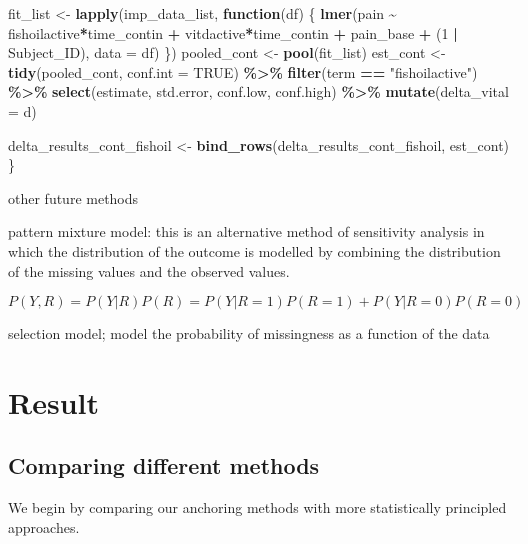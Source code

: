 \documentclass{article}
\newenvironment{Shaded}{\begin{snugshade}}{\end{snugshade}}
\newcommand{\AttributeTok}[1]{\textcolor[rgb]{0.13,0.29,0.53}{#1}}
\newcommand{\ConstantTok}[1]{\textcolor[rgb]{0.56,0.35,0.01}{#1}}
\newcommand{\ControlFlowTok}[1]{\textcolor[rgb]{0.13,0.29,0.53}{\textbf{#1}}}
\newcommand{\DecValTok}[1]{\textcolor[rgb]{0.00,0.00,0.81}{#1}}
\newcommand{\FunctionTok}[1]{\textcolor[rgb]{0.13,0.29,0.53}{\textbf{#1}}}
\newcommand{\NormalTok}[1]{#1}
\newcommand{\OtherTok}[1]{\textcolor[rgb]{0.56,0.35,0.01}{#1}}
\newcommand{\SpecialCharTok}[1]{\textcolor[rgb]{0.81,0.36,0.00}{\textbf{#1}}}
\newcommand{\StringTok}[1]{\textcolor[rgb]{0.31,0.60,0.02}{#1}}
\begin{document}
\begin{Shaded}
\begin{Highlighting}[]
\NormalTok{  fit\_list }\OtherTok{\textless{}{-}} \FunctionTok{lapply}\NormalTok{(imp\_data\_list, }\ControlFlowTok{function}\NormalTok{(df) \{}
    \FunctionTok{lmer}\NormalTok{(pain }\SpecialCharTok{\textasciitilde{}}\NormalTok{ fishoilactive}\SpecialCharTok{*}\NormalTok{time\_contin }\SpecialCharTok{+}\NormalTok{ vitdactive}\SpecialCharTok{*}\NormalTok{time\_contin }\SpecialCharTok{+}\NormalTok{ pain\_base }\SpecialCharTok{+} 
\NormalTok{           (}\DecValTok{1} \SpecialCharTok{|}\NormalTok{ Subject\_ID), }\AttributeTok{data =}\NormalTok{ df)}
\NormalTok{  \})}
\NormalTok{  pooled\_cont }\OtherTok{\textless{}{-}} \FunctionTok{pool}\NormalTok{(fit\_list)}
\NormalTok{  est\_cont }\OtherTok{\textless{}{-}} \FunctionTok{tidy}\NormalTok{(pooled\_cont, }\AttributeTok{conf.int =} \ConstantTok{TRUE}\NormalTok{) }\SpecialCharTok{\%\textgreater{}\%}
    \FunctionTok{filter}\NormalTok{(term }\SpecialCharTok{==} \StringTok{"fishoilactive"}\NormalTok{) }\SpecialCharTok{\%\textgreater{}\%}
    \FunctionTok{select}\NormalTok{(estimate, std.error, conf.low, conf.high) }\SpecialCharTok{\%\textgreater{}\%}
    \FunctionTok{mutate}\NormalTok{(}\AttributeTok{delta\_vital =}\NormalTok{ d)}
  
\NormalTok{  delta\_results\_cont\_fishoil }\OtherTok{\textless{}{-}} \FunctionTok{bind\_rows}\NormalTok{(delta\_results\_cont\_fishoil, est\_cont)}
\NormalTok{\}}
\end{Highlighting}
\end{Shaded}

other future methods

pattern mixture model: this is an alternative method of sensitivity
analysis in which the distribution of the outcome is modelled by
combining the distribution of the missing values and the observed
values.

\[P(Y,R)=P(Y|R)P(R)=P(Y|R=1)P(R=1)+P(Y|R=0)P(R=0)\]

selection model; model the probability of missingness as a function of
the data

\section{Result}\label{result}

\subsection{Comparing different
methods}\label{comparing-different-methods}

We begin by comparing our anchoring methods with more statistically
principled approaches.
\end{document}
